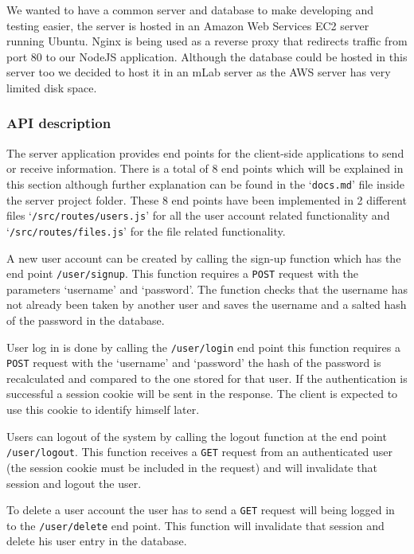 \documentclass[11pt]{article}
\begin{document}
We wanted to have a common server and database to make developing and testing easier, the server is hosted in an Amazon Web Services EC2 server running Ubuntu. Nginx is being used as a reverse proxy that redirects traffic from port 80 to our NodeJS application. Although the database could be hosted in this server too we decided to host it in an mLab \cite{mlab:19} server as the AWS server has very limited disk space.

\subsubsection*{API description}

The server application provides end points for the client-side applications to send or receive information. There is a total of 8 end points which will be explained in this section although further explanation can be found in the ‘{\tt docs.md}’ file inside the server project folder. These 8 end points have been implemented in 2 different files ‘{\tt /src/routes/users.js}’ for all the user account related functionality and ‘{\tt /src/routes/files.js}’ for the file related functionality.

A new user account can be created by calling the sign-up function which has the end point {\tt /user/signup}. This function requires a {\tt POST} request with the parameters ‘username’ and ‘password’. The function checks that the username has not already been taken by another user and saves the username and a salted hash of the password in the database.

User log in is done by calling the {\tt /user/login} end point this function requires a {\tt POST} request with the ‘username’ and ‘password’ the hash of the password is recalculated and compared to the one stored for that user. If the authentication is successful a session cookie will be sent in the response. The client is expected to use this cookie to identify himself later.

Users can logout of the system by calling the logout function at the end point {\tt /user/logout}. This function receives a {\tt GET} request from an authenticated user (the session cookie must be included in the request) and will invalidate that session and logout the user.

To delete a user account the user has to send a {\tt GET} request will being logged in to the {\tt /user/delete} end point. This function will invalidate that session and delete his user entry in the database.
\end{document}
